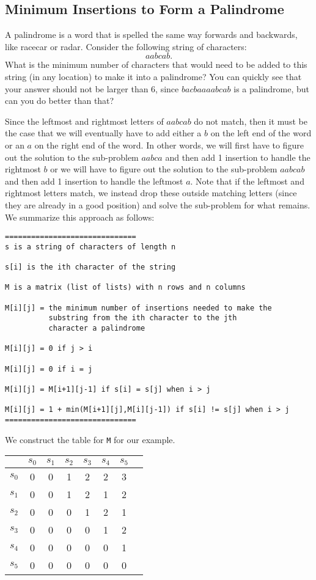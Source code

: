 \documentclass{ximera}
\begin{document}
\subsection{Minimum Insertions to Form a Palindrome}

A palindrome is a word that is spelled the same way forwards and backwards, like racecar or radar. Consider the following string of characters: $$aabcab.$$ What is the minimum number of characters that would need to be added to this string (in any location) to make it into a palindrome? You can quickly see that your answer should not be larger than 6, since $bacbaaaabcab$ is a palindrome, but can you do better than that?

Since the leftmost and rightmost letters of $aabcab$ do not match, then it must be the case that we will eventually have to add either a $b$ on the left end of the word or an $a$ on the right end of the word. In other words, we will first have to figure out the solution to the sub-problem $aabca$ and then add 1 insertion to handle the rightmost $b$ or we will have to figure out the solution to the sub-problem $aabcab$ and then add 1 insertion to handle the leftmost $a$. Note that if the leftmost and rightmost letters match, we instead drop these outside matching letters (since they are already in a good position) and solve the sub-problem for what remains. We summarize this approach as follows:

\begin{verbatim}
==============================
s is a string of characters of length n

s[i] is the ith character of the string

M is a matrix (list of lists) with n rows and n columns

M[i][j] = the minimum number of insertions needed to make the
          substring from the ith character to the jth 
          character a palindrome

M[i][j] = 0 if j > i

M[i][j] = 0 if i = j

M[i][j] = M[i+1][j-1] if s[i] = s[j] when i > j

M[i][j] = 1 + min(M[i+1][j],M[i][j-1]) if s[i] != s[j] when i > j
==============================
\end{verbatim}

We construct the table for \verb|M| for our example.

\begin{center}
	\begin{tabular}{|c|c|c|c|c|c|c|c|}
		\hline
		& $s_0$ & $s_1$ & $s_2$ & $s_3$ & $s_4$ & $s_5$\\
		\hline
		\hline
		$s_0$ & 0& 0& 1& 2& 2& 3\\
		\hline
		$s_1$ & 0& 0& 1& 2& 1& 2\\
		\hline
	        $s_2$ & 0& 0& 0& 1& 2& 1\\
		\hline
		$s_3$ & 0& 0& 0& 0& 1& 2\\
		\hline
	        $s_4$ & 0& 0& 0& 0& 0& 1\\
		\hline
	        $s_5$ & 0& 0& 0& 0& 0& 0\\
		\hline
	\end{tabular}
\end{center}
\end{document}
